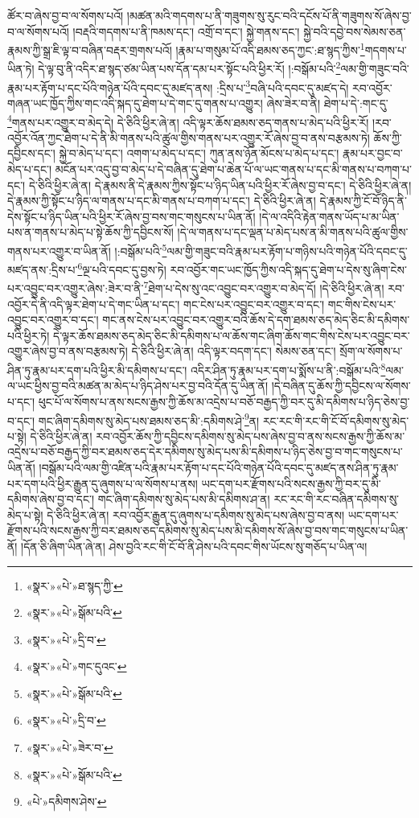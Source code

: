 ཚོར་བ་ཞེས་བྱ་བ་ལ་སོགས་པའོ། །མཚན་མའི་གདགས་པ་ནི་གཟུགས་སུ་རུང་བའི་དངོས་པོ་ནི་གཟུགས་སོ་ཞེས་བྱ་བ་ལ་སོགས་པའོ། །བརྡའི་གདགས་པ་ནི་ཁམས་དང་། འགྲོ་བ་དང་། སྐྱེ་གནས་དང་། སྐྱེ་བའི་དབྱེ་བས་སེམས་ཅན་རྣམས་ཀྱི་སྒྲ་ཇི་ལྟ་བ་བཞིན་བརྡར་གྲགས་པའོ། །རྣམ་པ་གསུམ་པོ་འདི་ཐམས་ཅད་ཀྱང་:ཐ་སྙད་ཀྱིས་\footnote{«སྣར་»«པེ་»ཐ་སྙད་ཀྱི་}གདགས་པ་ཡིན་ཏེ། དེ་ལྟ་བུ་ནི་འདིར་ཐ་སྙད་ཙམ་ཡིན་པས་དོན་དམ་པར་སྟོང་པའི་ཕྱིར་རོ། །:བསྒོམ་པའི་\footnote{«སྣར་»«པེ་»སྒོམ་པའི་}ལམ་གྱི་གཟུང་བའི་རྣམ་པར་རྟོག་པ་དང་པོའི་གཉེན་པོའི་དབང་དུ་མཛད་ནས། :དྲིས་པ་\footnote{«སྣར་»«པེ་»དྲི་བ་}བཞི་པའི་དབང་དུ་མཛད་དེ། རབ་འབྱོར་གཞན་ཡང་ཁྱོད་ཀྱིས་གང་འདི་སྐད་དུ་ཐེག་པ་དེ་གང་དུ་གནས་པ་འགྱུར། ཞེས་ཟེར་བ་ནི། ཐེག་པ་དེ་:གང་དུ་\footnote{«སྣར་»«པེ་»གང་དུའང་}གནས་པར་འགྱུར་བ་མེད་དེ། དེ་ཅིའི་ཕྱིར་ཞེ་ན། འདི་ལྟར་ཆོས་ཐམས་ཅད་གནས་པ་མེད་པའི་ཕྱིར་རོ། །རབ་འབྱོར་འོན་ཀྱང་ཐེག་པ་དེ་ནི་མི་གནས་པའི་ཚུལ་གྱིས་གནས་པར་འགྱུར་རོ་ཞེས་བྱ་བ་ནས་བརྩམས་ཏེ། ཆོས་ཀྱི་དབྱིངས་དང་། སྐྱེ་བ་མེད་པ་དང་། འགག་པ་མེད་པ་དང་། ཀུན་ནས་ཉོན་མོངས་པ་མེད་པ་དང་། རྣམ་པར་བྱང་བ་མེད་པ་དང་། མངོན་པར་འདུ་བྱ་བ་མེད་པ་དེ་བཞིན་དུ་ཐེག་པ་ཆེན་པོ་ལ་ཡང་གནས་པ་དང་མི་གནས་པ་བཀག་པ་དང་། དེ་ཅིའི་ཕྱིར་ཞེ་ན། དེ་རྣམས་ནི་དེ་རྣམས་ཀྱིས་སྟོང་པ་ཉིད་ཡིན་པའི་ཕྱིར་རོ་ཞེས་བྱ་བ་དང་། དེ་ཅིའི་ཕྱིར་ཞེ་ན། དེ་རྣམས་ཀྱི་སྟོང་པ་ཉིད་ལ་གནས་པ་དང་མི་གནས་པ་བཀག་པ་དང་། དེ་ཅིའི་ཕྱིར་ཞེ་ན། དེ་རྣམས་ཀྱི་ངོ་བོ་ཉིད་ནི་དེས་སྟོང་པ་ཉིད་ཡིན་པའི་ཕྱིར་རོ་ཞེས་བྱ་བས་གང་གསུངས་པ་ཡིན་ནོ། །དེ་ལ་འདིའི་རྟེན་གནས་ཡོད་པ་མ་ཡིན་པས་ན་གནས་པ་མེད་པ་སྟེ་ཆོས་ཀྱི་དབྱིངས་སོ། །དེ་ལ་གནས་པ་དང་ལྡན་པ་མེད་པས་ན་མི་གནས་པའི་ཚུལ་གྱིས་གནས་པར་འགྱུར་བ་ཡིན་ནོ། །:བསྒོམ་པའི་\footnote{«སྣར་»«པེ་»སྒོམ་པའི་}ལམ་གྱི་གཟུང་བའི་རྣམ་པར་རྟོག་པ་གཉིས་པའི་གཉེན་པོའི་དབང་དུ་མཛད་ནས་:དྲིས་པ་\footnote{«སྣར་»«པེ་»དྲི་བ་}ལྔ་པའི་དབང་དུ་བྱས་ཏེ། རབ་འབྱོར་གང་ཡང་ཁྱོད་ཀྱིས་འདི་སྐད་དུ་ཐེག་པ་དེས་སུ་ཞིག་ངེས་པར་འབྱུང་བར་འགྱུར་ཞེས་:ཟེར་བ་ནི་\footnote{«སྣར་»«པེ་»ཟེར་བ་}ཐེག་པ་དེས་སུ་འང་འབྱུང་བར་འགྱུར་བ་མེད་དོ། །དེ་ཅིའི་ཕྱིར་ཞེ་ན། རབ་འབྱོར་དེ་ནི་འདི་ལྟར་ཐེག་པ་དེ་གང་ཡིན་པ་དང་། གང་ངེས་པར་འབྱུང་བར་འགྱུར་བ་དང་། གང་གིས་ངེས་པར་འབྱུང་བར་འགྱུར་བ་དང་། གང་ནས་ངེས་པར་འབྱུང་བར་འགྱུར་བའི་ཆོས་དེ་དག་ཐམས་ཅད་མེད་ཅིང་མི་དམིགས་པའི་ཕྱིར་ཏེ། དེ་ལྟར་ཆོས་ཐམས་ཅད་མེད་ཅིང་མི་དམིགས་པ་ལ་ཆོས་གང་ཞིག་ཆོས་གང་གིས་ངེས་པར་འབྱུང་བར་འགྱུར་ཞེས་བྱ་བ་ནས་བརྩམས་ཏེ། དེ་ཅིའི་ཕྱིར་ཞེ་ན། འདི་ལྟར་བདག་དང་། སེམས་ཅན་དང་། སྲོག་ལ་སོགས་པ་ཤིན་ཏུ་རྣམ་པར་དག་པའི་ཕྱིར་མི་དམིགས་པ་དང་། འདིར་ཤིན་ཏུ་རྣམ་པར་དག་པ་སྨོས་པ་ནི་:བསྒོམ་པའི་\footnote{«སྣར་»«པེ་»སྒོམ་པའི་}ལམ་ལ་ཡང་ཕྱིས་བྱ་བའི་མཚན་མ་མེད་པ་ཉིད་ཤེས་པར་བྱ་བའི་དོན་དུ་ཡིན་ནོ། །དེ་བཞིན་དུ་ཆོས་ཀྱི་དབྱིངས་ལ་སོགས་པ་དང་། ཕུང་པོ་ལ་སོགས་པ་ནས་སངས་རྒྱས་ཀྱི་ཆོས་མ་འདྲེས་པ་བཅོ་བརྒྱད་ཀྱི་བར་དུ་མི་དམིགས་པ་ཉིད་ཅེས་བྱ་བ་དང་། གང་ཞིག་དམིགས་སུ་མེད་པས་ཐམས་ཅད་མི་:དམིགས་ཤེ་\footnote{«པེ་»དམིགས་ཤེས་}ན། རང་རང་གི་རང་གི་ངོ་བོ་དམིགས་སུ་མེད་པ་སྟེ། དེ་ཅིའི་ཕྱིར་ཞེ་ན། རབ་འབྱོར་ཆོས་ཀྱི་དབྱིངས་དམིགས་སུ་མེད་པས་ཞེས་བྱ་བ་ནས་སངས་རྒྱས་ཀྱི་ཆོས་མ་འདྲེས་པ་བཅོ་བརྒྱད་ཀྱི་བར་ཐམས་ཅད་དེར་དམིགས་སུ་མེད་པས་མི་དམིགས་པ་ཉིད་ཅེས་བྱ་བ་གང་གསུངས་པ་ཡིན་ནོ། །བསྒོམ་པའི་ལམ་གྱི་འཛིན་པའི་རྣམ་པར་རྟོག་པ་དང་པོའི་གཉེན་པོའི་དབང་དུ་མཛད་ནས་ཤིན་ཏུ་རྣམ་པར་དག་པའི་ཕྱིར་རྒྱུན་དུ་ཞུགས་པ་ལ་སོགས་པ་ནས། ཡང་དག་པར་རྫོགས་པའི་སངས་རྒྱས་ཀྱི་བར་དུ་མི་དམིགས་ཞེས་བྱ་བ་དང་། གང་ཞིག་དམིགས་སུ་མེད་པས་མི་དམིགས་ཤ་ན། རང་རང་གི་རང་བཞིན་དམིགས་སུ་མེད་པ་སྟེ། དེ་ཅིའི་ཕྱིར་ཞེ་ན། རབ་འབྱོར་རྒྱུན་དུ་ཞུགས་པ་དམིགས་སུ་མེད་པས་ཞེས་བྱ་བ་ནས། ཡང་དག་པར་རྫོགས་པའི་སངས་རྒྱས་ཀྱི་བར་ཐམས་ཅད་དམིགས་སུ་མེད་པས་མི་དམིགས་སོ་ཞེས་བྱ་བས་གང་གསུངས་པ་ཡིན་ནོ། །དོན་ཅི་ཞིག་ཡིན་ཞེ་ན། ཤེས་བྱའི་རང་གི་ངོ་བོ་ནི་ཤེས་པའི་དབང་གིས་ཡོངས་སུ་གཅོད་པ་ཡིན་ལ། 